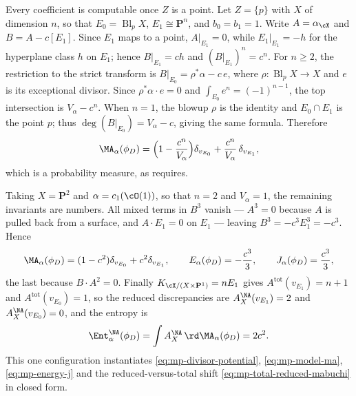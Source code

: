 \begin{example}
Every coefficient is computable once $Z$ is a point.  Let
$Z=\{p\}$ with $X$ of dimension $n$, so that
$E_0=\operatorname{Bl}_pX$, $E_1\cong\mathbf P^n$, and
$b_0=b_1=1$.  Write $A=\alpha_{\cX}$ and $B=A-c[E_1]$.  Since
$E_1$ maps to a point, $A|_{E_1}=0$, while
$E_1|_{E_1}=-h$ for the hyperplane class $h$ on $E_1$; hence
$B|_{E_1}=ch$ and $(B|_{E_1})^n=c^n$.  For $n\geq2$, the restriction to the strict transform is
$B|_{E_0}=\rho^*\alpha-c\,e$, where
$\rho:\operatorname{Bl}_pX\to X$ and $e$ is its exceptional divisor.
Since $\rho^*\alpha\cdot e=0$ and $\int_{E_0}e^n=(-1)^{n-1}$,
the top intersection is $V_\alpha-c^n$.  When $n=1$, the blowup
$\rho$ is the identity and $E_0\cap E_1$ is the point $p$; thus
$\deg(B|_{E_0})=V_\alpha-c$, giving the same formula.  Therefore
\[
 \MA_\alpha(\phi_D)
 =\Bigl(1-\frac{c^n}{V_\alpha}\Bigr)\delta_{v_{E_0}}
  +\frac{c^n}{V_\alpha}\,\delta_{v_{E_1}},
\]
which is a probability measure, as
 requires.

Taking $X=\mathbf P^2$ and $\alpha=c_1(\cO(1))$, so that
$n=2$ and $V_\alpha=1$, the remaining invariants are numbers.  All
mixed terms in $B^{3}$ vanish --- $A^3=0$ because $A$ is pulled back
from a surface, and $A\cdot E_1=0$ on $E_1$ --- leaving
$B^3=-c^3E_1^3=-c^3$.  Hence
\[
 \MA_\alpha(\phi_D)=(1-c^2)\delta_{v_{E_0}}+c^2\delta_{v_{E_1}},
 \qquad
 E_\alpha(\phi_D)=-\frac{c^3}{3},
 \qquad
 J_\alpha(\phi_D)=\frac{c^3}{3},
\]
the last because $B\cdot A^2=0$.  Finally
$K_{\cX/(X\times\mathbf P^1)}=nE_1$ gives
$A^{\mathrm{tot}}(v_{E_1})=n+1$ and
$A^{\mathrm{tot}}(v_{E_0})=1$, so the reduced discrepancies are
$A^{\NA}_X(v_{E_1})=2$ and $A^{\NA}_X(v_{E_0})=0$, and the entropy is
\[
 \Ent^{\NA}_\alpha(\phi_D)
 =\int A^{\NA}_X\,\rd\MA_\alpha(\phi_D)=2c^2 .
\]
This one configuration instantiates
\eqref{eq:mp-divisor-potential}, \eqref{eq:mp-model-ma},
\eqref{eq:mp-energy-j} and the reduced-versus-total shift
\eqref{eq:mp-total-reduced-mabuchi} in closed form.
\end{example}

